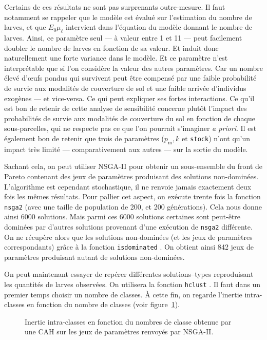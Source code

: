 Certains de ces résultats ne sont pas surprenants outre-mesure.
Il faut notamment se rappeler que le modèle est évalué sur l'estimation du nombre de larves, et que $E_0\mu_\ell$ intervient dans l'équation du modèle donnant le nombre de larves.
Ainsi, ce paramètre seul --- à valeur entre 1 et 11 --- peut facilement doubler le nombre de larves en fonction de sa valeur. Et induit donc naturellement une forte variance dans le modèle.
Et ce paramètre n'est interprétable que si l'on considère la valeur des autres paramètres.
Car un nombre élevé d'œufs pondus qui survivent peut être compensé par une faible probabilité de survie aux modalités de couverture de sol et une faible arrivée d'individus exogènes --- et vice-versa.
Ce qui peut expliquer ses fortes interactions.
Ce qu'il est bon de retenir de cette analyse de sensibilité concerne plutôt l'impact des probabilités de survie aux modalités de couverture du sol en fonction de chaque sous-parcelles, qui ne respecte pas ce que l'on pourrait s'imaginer \emph{a priori}.
Il est également bon de retenir que trois de paramètres ($p_{\text{m}}, k$ et \texttt{stock}) n'ont qu'un impact très limité --- comparativement aux autres --- sur la sortie du modèle.

Sachant cela, on peut utiliser NSGA-II pour obtenir un sous-ensemble du front de Pareto contenant des jeux de paramètres produisant des solutions non-dominées.
L'algorithme est cependant stochastique, il ne renvoie jamais exactement deux fois les mêmes résultats.
Pour pallier cet aspect, on exécute trente fois la fonction \texttt{nsga2} \citep{nsga} (avec une taille de population de 200, et 200 générations).
Cela nous donne ainsi 6000 solutions. Mais parmi ces 6000 solutions certaines sont peut-être dominées par d'autres solutions provenant d'une exécution de \texttt{nsga2} différente.
On ne récupère alors que les solutions non-dominées (et les jeux de paramètres correspondants) grâce à la fonction \texttt{is\textunderscore dominated} \citep{emoa}.
On obtient ainsi 842 jeux de paramètres produisant autant de solutions non-dominées.

On peut maintenant essayer de repérer différentes solutions--types reproduisant les quantités de larves observées.
On utilisera la fonction \texttt{hclust} \citep{R}.
Il faut dans un premier temps choisir un nombre de classes.
À cette fin, on regarde l'inertie intra-classes en fonction du nombre de classes (voir figure~\ref{fig:caha}).

\begin{figure}[ht]
 \centering
 \caption{Inertie intra-classes en fonction du nombres de classe obtenue par une CAH sur les jeux de paramètres renvoyés par NSGA-II.}
 \label{fig:caha}
\end{figure}

